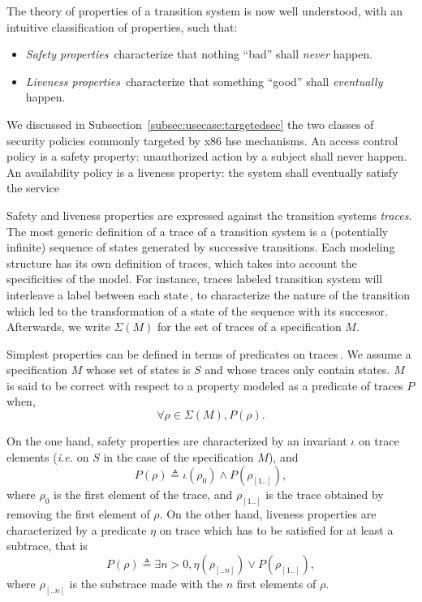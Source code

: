 The theory of properties of a transition system is now well understood, with an
intuitive classification of properties, such that:
%
\begin{itemize}
\item \emph{Safety properties}\,\cite{lamport1977proving,lamport1985logical}
  characterize that nothing ``bad'' shall \emph{never} happen.
\item \emph{Liveness properties}\,\cite{lamport1985logical,alpern1985liveness}
  characterize that something ``good'' shall \emph{eventually} happen.
\end{itemize}

We discussed in Subsection~\ref{subsec:usecase:targetedsec} the two classes of
security policies commonly targeted by x86 \ac{hse} mechanisms.
%
An access control policy is a safety property: unauthorized action by a
subject shall never happen.
%
An availability policy is a liveness property: the system shall eventually
satisfy the service

Safety and liveness properties are expressed against the transition systems
\emph{traces}.
%
The most generic definition of a trace of a transition system is a (potentially
infinite) sequence of states generated by successive transitions.
%
Each modeling structure has its own definition of traces, which takes into
account the specificities of the model.
%
For instance, traces labeled transition system will interleave a label between
each state\,\cite{vijayaraghavan2015modular}, to characterize the nature of the
transition which led to the transformation of a state of the sequence with its
successor.
%
Afterwards, we write \( \Sigma(M) \) for the set of traces of a specification
\( M \).

Simplest properties can be defined in terms of predicates on
traces\,\cite{alpern1987recognizing,schneider2000enforceable,basin2013enforceable}.
%
We assume a specification \( M \) whose set of states is \( S \) and whose
traces only contain states.
%
\( M \) is said to be correct with respect to a property modeled as a predicate
of traces \( P \) when,
%
\[
  \forall \rho \in \Sigma(M), P(\rho).
\]

On the one hand, safety properties are characterized by an invariant \( \iota \)
on trace elements (\emph{i.e.} on \( S \) in the case of the specification
\( M \)), and
%
\[
  P(\rho) \triangleq \iota(\rho_0) \wedge P(\rho_{[1..]}),
\]
%
where \( \rho_0 \) is the first element of the trace, and \( \rho_{[1..]} \) is
the trace obtained by removing the first element of \( \rho \).
%
On the other hand, liveness properties are characterized by a predicate
\( \eta \) on trace which has to be satisfied for at least a subtrace, that is
%
\[
  P(\rho) \triangleq \exists n > 0, \eta(\rho_{[..n]}) \vee P(\rho_{[1..]}),
\]
%
where \( \rho_{[..n]} \) is the substrace made with the \( n \) first elements
of \( \rho \).

